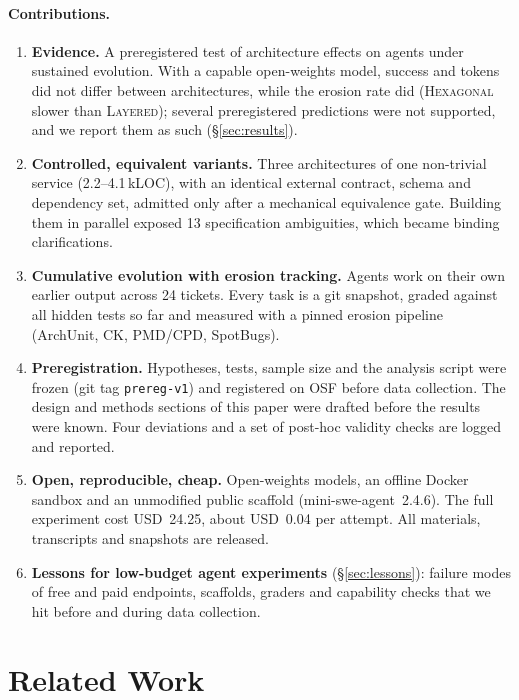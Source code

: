 \documentclass[10pt]{article}
\newcommand{\LAY}{\textsc{Layered}}
\newcommand{\HEX}{\textsc{Hexagonal}}
\newcommand{\code}[1]{\texttt{#1}}
\begin{document}
\paragraph{Contributions.}
\begin{enumerate}[itemsep=1pt]
  \item \textbf{Evidence.} A preregistered test of architecture effects on agents under
    sustained evolution. With a capable open-weights model, success and tokens did not differ
    between architectures, while the erosion rate did (\HEX{} slower than \LAY); several
    preregistered predictions were not supported, and we report them as such (\S\ref{sec:results}).
  \item \textbf{Controlled, equivalent variants.} Three architectures of one non-trivial
    service (2.2--4.1\,kLOC), with an identical external contract, schema and dependency set,
    admitted only after a mechanical equivalence gate. Building them in parallel exposed 13
    specification ambiguities, which became binding clarifications.
  \item \textbf{Cumulative evolution with erosion tracking.} Agents work on their own earlier
    output across 24 tickets. Every task is a git snapshot, graded against all hidden tests so far
    and measured with a pinned erosion pipeline (ArchUnit, CK, PMD/CPD, SpotBugs).
  \item \textbf{Preregistration.} Hypotheses, tests, sample size and the analysis script were
    frozen (git tag \code{prereg-v1}) and registered on OSF before data collection. The design
    and methods sections of this paper were drafted before the results were known. Four
    deviations and a set of post-hoc validity checks are logged and reported.
  \item \textbf{Open, reproducible, cheap.} Open-weights models, an offline Docker sandbox and an
    unmodified public scaffold (mini-swe-agent~2.4.6). The full experiment cost USD~24.25,
    about USD~0.04 per attempt. All materials, transcripts and snapshots are released.
  \item \textbf{Lessons for low-budget agent experiments} (\S\ref{sec:lessons}): failure modes of
    free and paid endpoints, scaffolds, graders and capability checks that we hit before and
    during data collection.
\end{enumerate}

\section{Related Work}\label{sec:related}
\end{document}
